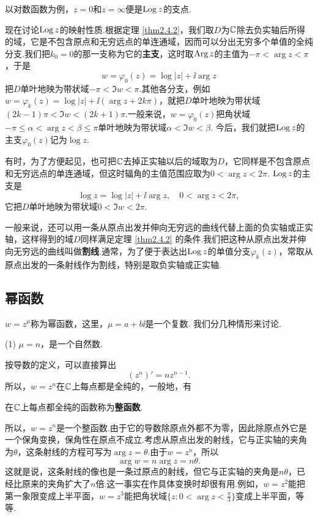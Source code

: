 以对数函数为例，$z=0$和$z=\infty$便是$\operatorname{Log} z$的支点.

现在讨论$\operatorname{Log} z$的映射性质.根据定理 \ref{thm2.4.2}，我们取$D$为$\mathbb C$除去负实轴后所得的域，它是不包含原点和无穷远点的单连通域，因而可以分出无穷多个单值的全纯分支.我们把$k_0=0$的那一支称为它的\textbf{主支}，这时取$\operatorname{Arg} z$的主值为$-\pi<\arg z<\pi$，于是
\[
  w = \varphi_0(z) = \log|z| + \ii\arg z
\]
把$D$单叶地映为带状域$-\pi<\Im w<\pi$.其他各分支，例如$w=\varphi_k(z)=\log|z|+\ii(\arg z+2k\pi)$，就把$D$单叶地映为带状域$(2k-1)\pi<\Im w<(2k+1)\pi$.一般来说，$w=\varphi_0(z)$把角状域$-\pi\le\alpha<\arg z<\beta\le\pi$单叶地映为带状域$\alpha<\Im w<\beta$. 今后，我们就把$\operatorname{Log} z$的主支$\varphi_0(z)$记为$\log z$.

有时，为了方便起见，也可把$\mathbb C$去掉正实轴以后的域取为$D$，它同样是不包含原点和无穷远点的单连通域，但这时辐角的主值范围应取为$0<\arg z<2\pi$. $\operatorname{Log} z$的主支是
\[
  \log z = \log|z| + \ii\arg z,\quad 0 < \arg z < 2\pi,
\]
它把$D$单叶地映为带状域$0<\Im w<2\pi$.

一般来说，还可以用一条从原点出发并伸向无穷远的曲线代替上面的负实轴或正实轴，这样得到的域$D$同样满足定理 \ref{thm2.4.2} 的条件.我们把这种从原点出发并伸向无穷远的曲线叫做\textbf{割线}.通常，为了便于表达出$\operatorname{Log} z$的单值分支$\varphi_k(z)$，常取从原点出发的一条射线作为割线，特别是取负实轴或正实轴.

\subsection{幂函数}
$w=z^\mu$称为幂函数，这里，$\mu=a+b\ii$是一个复数. 我们分几种情形来讨论.

(1) $\mu=n$，{\kaishu 是一个自然数.}

按导数的定义，可以直接算出
\[
  (z^n)' = nz^{n-1}.
\]
所以，$w=z^n$在$\mathbb C$上每点都是全纯的，一般地，有
\begin{definition}\label{def2.4.4}
  在$\mathbb C$上每点都全纯的函数称为\textbf{整函数}.
\end{definition}

所以，$w=z^n$是一个整函数.由于它的导数除原点外都不为零，因此除原点外它是一个保角变换，保角性在原点不成立.考虑从原点出发的射线，它与正实轴的夹角为$\theta$，这条射线的方程可写为$\arg z=\theta$.由于$w=z^n$，所以
\[
  \arg w = n\arg z = n\theta.
\]
这就是说，这条射线的像也是一条过原点的射线，但它与正实轴的夹角是$n\theta$，已经比原来的夹角扩大了$n$倍.这一事实在作具体变换时却很有用.例如，$w=z^2$能把第一象限变成上半平面，$w=z^3$能把角状域$\bigg\{z:0<\arg z<\frac\pi3\bigg\}$变成上半平面，等等.

